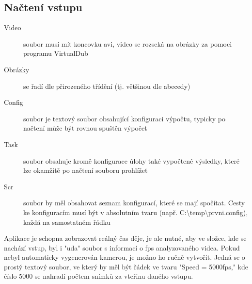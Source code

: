 \documentclass[a4paper,12pt]{article}
\begin{document}
\subsection{Načtení vstupu}
\begin{description}
\item[Video] soubor musí mít koncovku avi, video se rozseká na obrázky za pomoci programu VirtualDub 
\item[Obrázky] se řadí dle přirozeného třídění (tj. většinou dle abecedy)
\item[Config] soubor je textový soubor obsahující konfiguraci výpočtu, typicky po načtení může být rovnou spuštěn výpočet
\item[Task] soubor obsahuje kromě konfigurace úlohy také vypočtené výsledky, které lze okamžitě po načtení souboru prohlížet
\item[Scr] soubor by měl obsahovat seznam konfigurací, které se mají spočítat. Cesty ke konfiguracím musí být v absolutním tvaru (např. C:\textbackslash temp\textbackslash prvni.config), každá na samostatném řádku
\end{description}
Aplikace je schopna zobrazovat reálný čas děje, je ale nutné, aby ve složce, kde se nachází vstup, byl i "uda" soubor s informací o fps analyzovaného videa. Pokud nebyl automaticky vygenerován kamerou, je možno ho ručně vytvořit. Jedná se o prostý textový soubor, ve který by měl být řádek ve tvaru "Speed = 5000fps," kde číslo 5000 se nahradí počtem snímků za vteřinu daného vstupu.
\newpage
\end{document}

